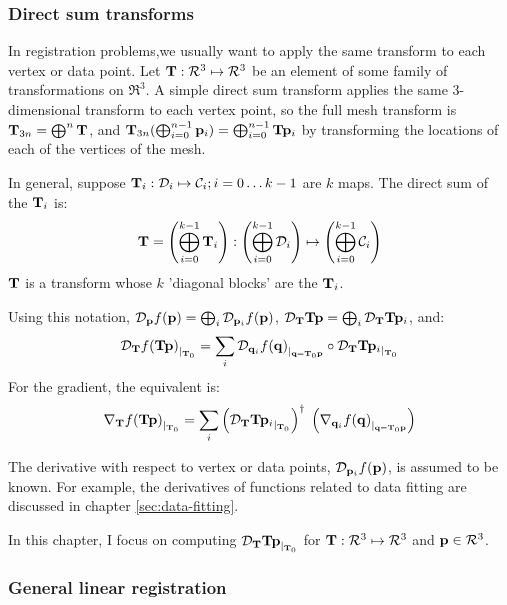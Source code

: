 \subsubsection{Direct sum transforms}
\label{sec:Direct-sum-transforms}

In registration problems,we usually want to
apply the same transform to each vertex or data point.
Let ${\mathbf T} : \mathcal{R}^3 \mapsto \mathcal{R}^3$ be an element
of some family of transformations on $\Re^3$.
A simple direct sum transform applies the same 3-dimensional
transform to each vertex point,
so the full mesh transform is
${\mathbf T}_{3n} = \bigoplus^n {\mathbf T}$,
and ${\mathbf T}_{3n} (\bigoplus_{i=0}^{n-1} {\mathbf p}_i) = \bigoplus_{i=0}^{n-1} {\mathbf T} {\mathbf p}_i$
by transforming the locations of each of the vertices
of the mesh.

In general, suppose ${\mathbf T}_i :
{\mathcal D}_i \mapsto {\mathcal C}_i; i = 0 \ldots k-1$
are $k$ maps.
The direct sum of the ${\mathbf T}_i$ is:
\begin{equation}
\label{eq:diagonal-blocks}
{\mathbf T} =
\left( \bigoplus_{i=0}^{k-1} {\mathbf T}_i \right) :
\left( \bigoplus_{i=0}^{k-1}{\mathcal D}_i \right)
\mapsto
\left( \bigoplus_{i=0}^{k-1}{\mathcal C}_i \right)
\end{equation}
${\mathbf T}$ is a transform whose
$k$ 'diagonal blocks' are the ${\mathbf T}_i$.

Using this notation,
${\mathcal D}_{{\mathbf p}}{f({\mathbf p})} = \bigoplus_i {\mathcal D}_{{\mathbf p}_i}{f({\mathbf p})}$,
${\mathcal D}_{{\mathbf T}}{{\mathbf T}{\mathbf p}} = \bigoplus_i {\mathcal D}_{{\mathbf T}}{{\mathbf T}{\mathbf p}_i}$,
and:
\begin{equation}
\label{eq:total-registration-transform-derivative}
{\mathcal D}_{{\mathbf T}}{f( {\mathbf T} {\mathbf p} )}_{\mid_{{\mathbf T}_0}}
 =
\sum_i
{\mathcal D}_{{\mathbf q}_i}{f({\mathbf q})}_{\mid_{{\mathbf q}={\mathbf T}_0{\mathbf p}}}
\circ
{\mathcal D}_{{\mathbf T}}{{\mathbf T}{\mathbf p}_i}_{\mid_{{\mathbf T}_0}}
\end{equation}
For the gradient, the equivalent is:
\begin{equation}
\label{eq:registration-gradient-sum}
{\mathbf \nabla}_{{\mathbf T}}{{f( {\mathbf T} {\mathbf p} )}}_{\mid_{{\mathbf T}_0}}
 =
\sum_i
\left( {\mathcal D}_{{\mathbf T}}{{\mathbf T}{\mathbf p}_i}_{\mid_{{\mathbf T}_0}} \right)^{\dagger} \;
\left( {\mathbf \nabla}_{{\mathbf q}_i}{{f({\mathbf q})}}_{\mid_{{\mathbf q}={\mathbf T}_0{\mathbf p}}} \right)
\end{equation}

The derivative with respect to vertex or data points,
${\mathcal D}_{{\mathbf p}_i}{f({\mathbf p})}$,
is assumed to be known.
For example, the derivatives of functions
related to data fitting
are discussed in chapter \ref{sec:data-fitting}.

In this chapter, I focus on computing
${\mathcal D}_{{\mathbf T}}{{\mathbf T}{\mathbf p}}_{\mid_{{\mathbf T}_0}}$
for ${\mathbf T} : \mathcal{R}^3 \mapsto \mathcal{R}^3$
and ${\mathbf p} \in \mathcal{R}^3$.

\subsubsection{General linear registration}
\label{sec:General-linear-registration}

